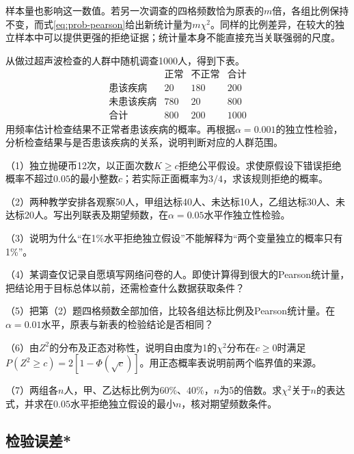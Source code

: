 样本量也影响这一数值。若另一次调查的四格频数恰为原表的\(m\)倍，各组比例保持不变，而式\eqref{eq:prob-pearson}给出新统计量为\(m\chi^2\)。同样的比例差异，在较大的独立样本中可以提供更强的拒绝证据；统计量本身不能直接充当关联强弱的尺度。

\begin{example}[据2025年全国I卷改编]\label{ex:prob-medical-table}
从做过超声波检查的人群中随机调查1000人，得到下表。
\[
\begin{array}{c|rr|r}
 &\text{正常}&\text{不正常}&\text{合计}\\\hline
 \text{患该疾病}&20&180&200\\
 \text{未患该疾病}&780&20&800\\\hline
 \text{合计}&800&200&1000
\end{array}
\]
用频率估计检查结果不正常者患该疾病的概率。再根据\(\alpha=0.001\)的独立性检验，分析检查结果与是否患该疾病的关系，说明判断对应的人群范围。
\end{example}

\begin{exercise}
\mbox{}\par\nobreak

（1）独立抛硬币12次，以正面次数\(K\ge c\)拒绝公平假设。求使原假设下错误拒绝概率不超过\(0.05\)的最小整数\(c\)；若实际正面概率为\(3/4\)，求该规则拒绝的概率。

（2）两种教学安排各观察50人，甲组达标40人、未达标10人，乙组达标30人、未达标20人。写出列联表及期望频数，在\(\alpha=0.05\)水平作独立性检验。

（3）说明为什么“在1\%水平拒绝独立假设”不能解释为“两个变量独立的概率只有1\%”。

（4）某调查仅记录自愿填写网络问卷的人。即使计算得到很大的Pearson统计量，把结论用于目标总体以前，还需检查什么数据获取条件？

（5）把第（2）题四格频数全部加倍，比较各组达标比例及Pearson统计量。在\(\alpha=0.01\)水平，原表与新表的检验结论是否相同？

（6）由\(Z^2\)的分布及正态对称性，说明自由度为1的\(\chi^2\)分布在\(c\ge0\)时满足\(P(Z^2\ge c)=2[1-\Phi(\sqrt c)]\)。用正态概率表说明前两个临界值的来源。

（7）两组各\(n\)人，甲、乙达标比例为\(60\%\)、\(40\%\)，\(n\)为5的倍数。求\(\chi^2\)关于\(n\)的表达式，并求在\(0.05\)水平拒绝独立假设的最小\(n\)，核对期望频数条件。
\end{exercise}

\FloatBarrier
\newpage
\subsection{检验误差*}

